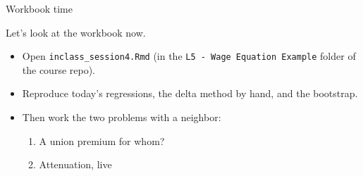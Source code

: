 \documentclass[aspectratio=169,11pt]{beamer}
\begin{document}
\begin{frame}{Workbook time}
\begin{center}
{\LARGE \alert{Let's look at the workbook now.}}
\end{center}
\bigskip
\begin{itemize}
	\item Open \texttt{inclass\_session4.Rmd} (in the \texttt{L5 - Wage Equation Example} folder of the course repo).
	\item Reproduce today's regressions, the delta method by hand, and the bootstrap.
	\item Then work the two problems with a neighbor:
	\begin{enumerate}
		\item A union premium for whom?
		\item Attenuation, live
	\end{enumerate}
\end{itemize}
\end{frame}
\end{document}
